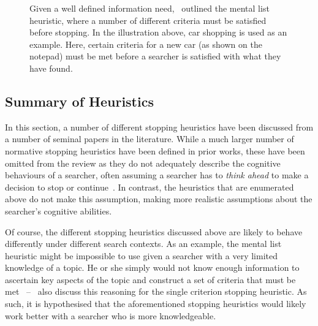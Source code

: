\begin{figure}[t!]
    \centering
    \caption[The mental list stopping heuristic]{Given a well defined information need,~\cite{nickles1995judgment} outlined the mental list heuristic, where a number of different criteria must be satisfied before stopping. In the illustration above, car shopping is used as an example. Here, certain criteria for a new car (as shown on the notepad) must be met before a searcher is satisfied with what they have found.}
    \label{fig:mental_list}
\end{figure}

\subsection{Summary of Heuristics}
In this section, a number of different stopping heuristics have been discussed from a number of seminal papers in the literature. While a much larger number of normative stopping heuristics have been defined in prior works, these have been omitted from the review as they do not adequately describe the cognitive behaviours of a searcher, often assuming a searcher has to \emph{think ahead} to make a decision to stop or continue~\citep{browne2004stopping_rules}. In contrast, the heuristics that are enumerated above do not make this assumption, making more realistic assumptions about the searcher's cognitive abilities.

Of course, the different stopping heuristics discussed above are likely to behave differently under different search contexts. As an example, the mental list heuristic might be impossible to use given a searcher with a very limited knowledge of a topic. He or she simply would not know enough information to ascertain key aspects of the topic and construct a set of criteria that must be met~\citep{browne2005stopping_rules} --~\cite{gigerenzer1999betting} also discuss this reasoning for the single criterion stopping heuristic. As such, it is hypothesised that the aforementioned stopping heuristics would likely work better with a searcher who is more knowledgeable.

